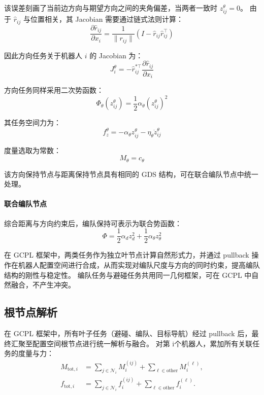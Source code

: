 该误差刻画了当前边方向与期望方向之间的夹角偏差，当两者一致时 $z_{ij}^{\theta}=0$。
由于 $\hat r_{ij}$ 与位置相关，其 Jacobian 需要通过链式法则计算：
\begin{equation}
    \frac{\partial \hat r_{ij}}{\partial x_i}
    =
    \frac{1}{\|r_{ij}\|}
    \left(
    I - \hat r_{ij}\hat r_{ij}^\top
    \right)
\end{equation}

因此方向任务关于机器人 $i$ 的 Jacobian 为：
\begin{equation}
    J_i^\theta
    =
    -\hat r_{ij}^{*\top}
    \frac{\partial \hat r_{ij}}{\partial x_i}
\end{equation}

方向任务同样采用二次势函数：
\begin{equation}
    \Phi_\theta(z_{ij}^\theta)
    =
    \frac{1}{2}
    \alpha_\theta
    \left(z_{ij}^\theta\right)^2
\end{equation}

其任务空间力为：
\begin{equation}
    f_z^\theta
    =
    -\alpha_\theta z_{ij}^\theta
    -
    \eta_\theta \dot z_{ij}^\theta
\end{equation}

度量选取为常数：
\begin{equation}
    M_\theta = c_\theta
\end{equation}

该方向保持节点与距离保持节点具有相同的 GDS 结构，可在联合编队节点中统一处理。

\paragraph{联合编队节点}

综合距离与方向约束后，编队保持可表示为联合势函数：
\begin{equation}
    \Phi =
    \frac{1}{2}\alpha_d z_d^2
    +
    \frac{1}{2}\alpha_\theta z_\theta^2
\end{equation}

在 GCPL 框架中，两类任务作为独立叶节点计算自然形式力，并通过 pullback 操作在机器人配置空间进行合成，从而实现对编队尺度与方向的同时约束，提高编队结构的刚性与稳定性。
编队任务与避碰任务共用同一几何框架，可在 GCPL 中自然融合，不产生冲突。
\subsection{根节点解析}

在 GCPL 框架中，所有叶子任务（避碰、编队、目标导航）经过 pullback 后，最终汇聚至配置空间根节点进行统一解析与融合。
对第 i个机器人，累加所有关联任务的度量与力：
\begin{equation}
\begin{aligned}
    M_{\text{tot},i} &= \sum_{j\in\mathcal{N}_i} M_i^{(ij)} + \sum_{\ell\in\text{other}} M_i^{(\ell)}, \\
    f_{\text{tot},i} &= \sum_{j\in\mathcal{N}_i} f_i^{(ij)} + \sum_{\ell\in\text{other}} f_i^{(\ell)}.
\end{aligned}
\end{equation}

